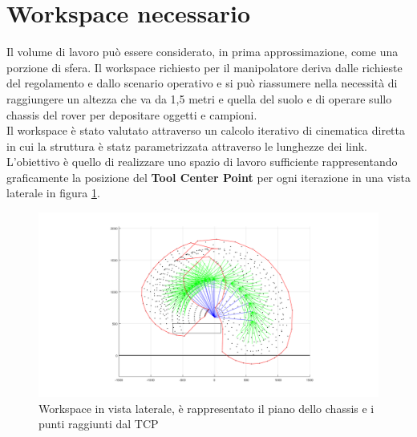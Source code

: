 \documentclass[%
corpo=11pt,
twoside,
 stile=classica,
oldstyle,
greek,%
]{toptesi}
\begin{document}
\section{Workspace necessario}





Il volume di lavoro può essere considerato, in prima approssimazione, come una porzione di sfera.
Il workspace richiesto per il manipolatore deriva dalle richieste del regolamento e dallo scenario operativo e si può riassumere nella necessità di raggiungere un altezza che va da 1,5 metri e quella del suolo e di operare sullo chassis del rover per depositare oggetti e campioni. \\
Il workspace è stato valutato attraverso un calcolo iterativo di cinematica diretta in cui la struttura è statz parametrizzata attraverso le lunghezze dei link. L'obiettivo è quello di realizzare uno spazio di lavoro sufficiente rappresentando graficamente la posizione del \textbf{Tool Center Point} per ogni iterazione in una vista laterale in figura \ref{fig:workspace}. \\
\begin{figure} [H]
	\centering
	\includegraphics[width=1\textwidth]{Plots/workspace.png}
	\caption{Workspace in vista laterale, è rappresentato il piano dello chassis e i punti raggiunti dal TCP}
	\label{fig:workspace}
\end{figure}
\end{document}

